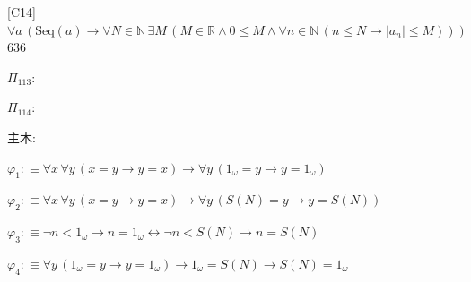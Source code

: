 \begin{fullproof}{[C14]}{$\forall a\,(\mathrm{Seq}(a) \to \forall N \in \mathbb{N}\,\exists M\,(M \in \mathbb{R} \land 0 \leq M \land \forall n \in \mathbb{N}\,(n \leq N \to \lvert a_{n} \rvert \leq M)))$}{636}
\begin{ptree}
\end{ptree}
\noindent$\Pi_{113}$:
\begin{ptree}
\noLine
{}
\end{ptree}
\noindent$\Pi_{114}$:
\begin{ptree}
\noLine
{}
\end{ptree}
\noindent 主木:
\begin{ptree}
\noLine
{}
\end{ptree}
\begin{abbrevlist}
\item $\varphi_{1} :\equiv \forall x\,\forall y\,(x = y \to y = x) \to \forall y\,(1_{\omega} = y \to y = 1_{\omega})$
\item $\varphi_{2} :\equiv \forall x\,\forall y\,(x = y \to y = x) \to \forall y\,(S(N) = y \to y = S(N))$
\item $\varphi_{3} :\equiv \neg n < 1_{\omega} \to n = 1_{\omega} \leftrightarrow \neg n < S(N) \to n = S(N)$
\item $\varphi_{4} :\equiv \forall y\,(1_{\omega} = y \to y = 1_{\omega}) \to 1_{\omega} = S(N) \to S(N) = 1_{\omega}$

\end{abbrevlist}
\end{fullproof}
